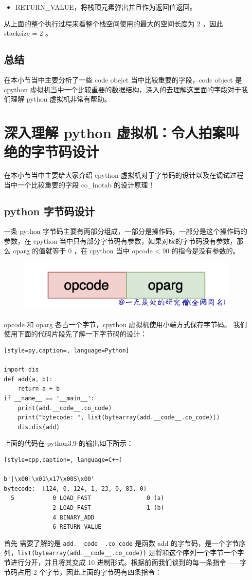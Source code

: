 \begin{itemize}
\item RETURN\_VALUE，将栈顶元素弹出并且作为返回值返回。 
\end{itemize}
从上面的整个执行过程来看整个栈空间使用的最大的空间长度为 2 ，因此 stacksize = 2 。
\subsection{总结}
在本小节当中主要分析了一些 code obejct 当中比较重要的字段，code object 是 cpython 虚拟机当中一个比较重要的数据结构，深入的去理解这里面的字段对于我们理解 python 虚拟机非常有帮助。

\section{深入理解 python 虚拟机：令人拍案叫绝的字节码设计}
在本小节当中主要给大家介绍 cpython 虚拟机对于字节码的设计以及在调试过程当中一个比较重要的字段 co\_lnotab 的设计原理！
\subsection{python 字节码设计}
一条 python 字节码主要有两部分组成，一部分是操作码，一部分是这个操作码的参数，在 cpython 当中只有部分字节码有参数，如果对应的字节码没有参数，那么 oparg 的值就等于 0 ，在 cpython 当中 opcode < 90 的指令是没有参数的。

    \begin{figure}[H]
        \centering
            \includegraphics[scale=.25]{images/45-bytecode.png}
						\caption{ }
        \label{fig:my_label}
    \end{figure}

opcode 和 oparg 各占一个字节，cpython 虚拟机使用小端方式保存字节码。
我们使用下面的代码片段先了解一下字节码的设计：
\begin{lstlisting}[style=py,caption=, language=Python]

import dis
def add(a, b):
    return a + b
if __name__ == '__main__':
    print(add.__code__.co_code)
    print("bytecode: ", list(bytearray(add.__code__.co_code)))
    dis.dis(add)
\end{lstlisting}
上面的代码在 python3.9 的输出如下所示：
\begin{lstlisting}[style=cpp,caption=, language=C++]

b'|\x00|\x01\x17\x00S\x00'
bytecode:  [124, 0, 124, 1, 23, 0, 83, 0]
  5           0 LOAD_FAST                0 (a)
              2 LOAD_FAST                1 (b)
              4 BINARY_ADD
              6 RETURN_VALUE
\end{lstlisting}
首先 需要了解的是 \verb|add.__code__.co_code| 是函数 add 的字节码，是一个字节序列，\verb|list(bytearray(add.__code__.co_code))| 是将和这个序列一个字节一个字节进行分开，并且将其变成 10 进制形式。根据前面我们谈到的每一条指令——字节码占用 2 个字节，因此上面的字节码有四条指令：

